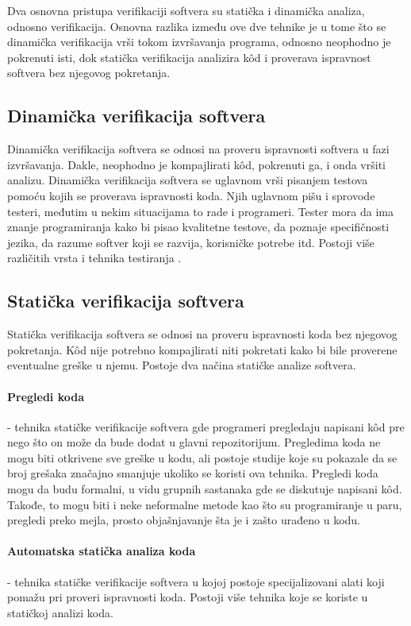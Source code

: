 \documentclass[12pt,oneside]{memoir}
\begin{document}
Dva osnovna pristupa verifikaciji softvera su statička i dinamička analiza, odnosno verifikacija. Osnovna razlika između ove dve tehnike je u tome što se dinamička verifikacija vrši tokom izvršavanja programa, odnosno neophodno je pokrenuti isti, dok statička verifikacija analizira k\^od i proverava ispravnost softvera bez njegovog pokretanja.

\subsection{Dinamička verifikacija softvera}
Dinamička verifikacija softvera se odnosi na proveru ispravnosti softvera u fazi izvršavanja. Dakle, neophodno je kompajlirati k\^od, pokrenuti ga, i onda vršiti analizu. Dinamička verifikacija softvera se uglavnom vrši pisanjem testova pomoću kojih se proverava ispravnosti koda. Njih uglavnom pišu i sprovode testeri, međutim u nekim situacijama to rade i programeri. Tester mora da ima znanje programiranja kako bi pisao kvalitetne testove, da poznaje specifičnosti jezika, da razume softver koji se razvija, korisničke potrebe itd. Postoji više različitih vrsta i tehnika testiranja \cite{testing_book} \cite{testiranje}. 

\subsection{Statička verifikacija softvera}
Statička verifikacija softvera se odnosi na proveru ispravnosti koda bez njegovog pokretanja. K\^od nije potrebno kompajlirati niti pokretati kako bi bile proverene eventualne greške u njemu. Postoje dva načina statičke analize softvera.

\paragraph{Pregledi koda} - tehnika statičke verifikacije softvera gde programeri pregledaju napisani k\^od pre nego što on može da bude dodat u glavni repozitorijum. Pregledima koda ne mogu biti otkrivene sve greške u kodu, ali postoje studije \cite{code_review} koje su pokazale da se broj grešaka značajno smanjuje ukoliko se koristi ova tehnika. Pregledi koda mogu da budu formalni, u vidu grupnih sastanaka gde se diskutuje napisani k\^od. Takođe, to mogu biti i neke neformalne metode kao što su programiranje u paru, pregledi preko mejla, prosto objašnjavanje šta je i zašto urađeno u kodu.

\paragraph{Automatska statička analiza koda} - tehnika statičke verifikacije softvera u kojoj postoje specijalizovani alati koji pomažu pri proveri ispravnosti koda. Postoji više tehnika koje se koriste u statičkoj analizi koda. 
\end{document}
